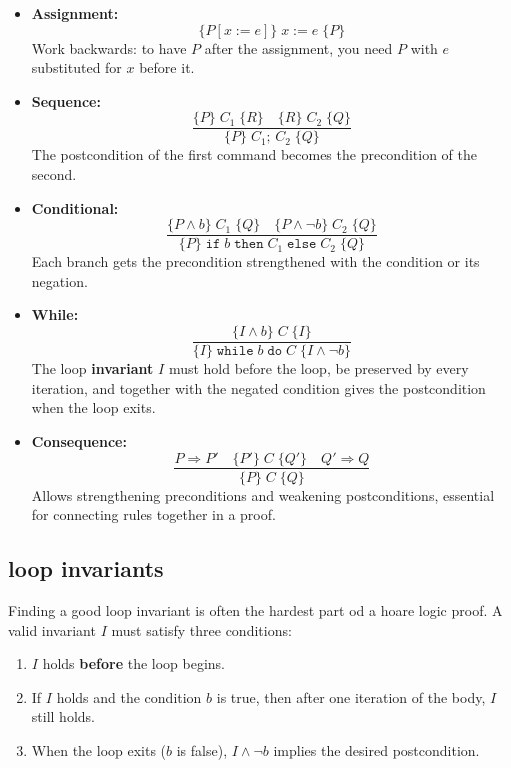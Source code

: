 \begin{itemize}
  \item \textbf{Assignment:}
  \[
    \{P[x := e]\}\; x := e\; \{P\}
  \]
  Work backwards: to have $P$ after the assignment, you need $P$ with
  $e$ substituted for $x$ before it.

  \item \textbf{Sequence:}
  \[
    \frac{\{P\}\; C_1\; \{R\} \quad \{R\}\; C_2\; \{Q\}}
         {\{P\}\; C_1;\, C_2\; \{Q\}}
  \]
  The postcondition of the first command becomes the precondition of
  the second.

  \item \textbf{Conditional:}
  \[
    \frac{\{P \wedge b\}\; C_1\; \{Q\} \quad \{P \wedge \neg b\}\;
    C_2\; \{Q\}}
         {\{P\}\; \texttt{if}\; b\; \texttt{then}\; C_1\;
         \texttt{else}\; C_2\; \{Q\}}
  \]
  Each branch gets the precondition strengthened with the condition or
  its negation.

  \item \textbf{While:}
  \[
    \frac{\{I \wedge b\}\; C\; \{I\}}
         {\{I\}\; \texttt{while}\; b\; \texttt{do}\; C\;
         \{I \wedge \neg b\}}
  \]
  The loop \textbf{invariant} $I$ must hold before the loop, be
  preserved by every iteration, and together with the negated condition
  gives the postcondition when the loop exits.

  \item \textbf{Consequence:}
  \[
    \frac{P \Rightarrow P' \quad \{P'\}\; C\; \{Q'\} \quad
    Q' \Rightarrow Q}
         {\{P\}\; C\; \{Q\}}
  \]
  Allows strengthening preconditions and weakening postconditions, essential for connecting rules together in a proof.
\end{itemize}


\subsection{loop invariants}
Finding a good loop invariant is often the hardest part od a hoare logic proof. A valid invariant $I$ must satisfy three conditions:
\begin{enumerate}
  \item $I$ holds \textbf{before} the loop begins.
  \item If $I$ holds and the condition $b$ is true, then after one
  iteration of the body, $I$ still holds.
  \item When the loop exits ($b$ is false), $I \wedge \neg b$ implies
  the desired postcondition.
\end{enumerate}

